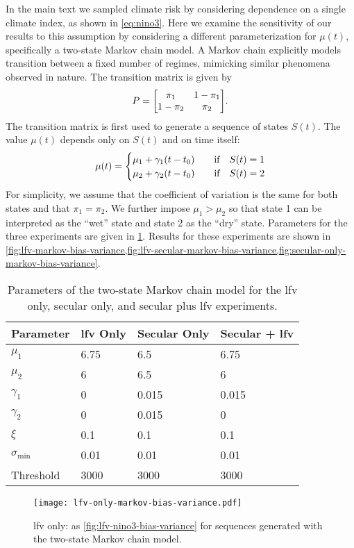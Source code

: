 \documentclass[
]{agujournal2018}
\begin{document}
In the main text we sampled climate risk by considering dependence on a single climate index, as shown in \cref{eq:nino3}.
Here we examine the sensitivity of our results to this assumption by considering a different parameterization for $\mu(t)$, specifically a two-state Markov chain model.
A Markov chain explicitly models transition between a fixed number of regimes, mimicking similar phenomena observed in nature.
The transition matrix is given by
\begin{equation}
  P = \mqty[\pi_1 & 1-\pi_1 \\ 1-\pi_2 & \pi_2].
\end{equation}
The transition matrix is first used to generate a sequence of states $S(t)$.
The value $\mu(t)$ depends only on $S(t)$ and on time itself:
\begin{equation}
  \mu(t) = \begin{cases}
    \mu_{1} + \gamma_1 \qty(t - t_0) & \qqtext{if} S(t) = 1 \\
    \mu_{2} + \gamma_2 \qty(t - t_0) & \qqtext{if} S(t) = 2
  \end{cases}
\end{equation}
For simplicity, we assume that the coefficient of variation is the same for both states and that $\pi_1=\pi_2$.
We further impose $\mu_{1} > \mu_{2}$ so that state 1 can be interpreted as the ``wet'' state and state 2 as the ``dry'' state.
Parameters for the three experiments are given in \cref{tab:markov-stationary}.
Results for these experiments are shown in \cref{fig:lfv-markov-bias-variance,fig:lfv-secular-markov-bias-variance,fig:secular-only-markov-bias-variance}.
\begin{table}[ht]
  \centering
  \begin{tabular}{llll}
    \toprule
    Parameter & \gls{lfv} Only & Secular Only & Secular + \gls{lfv} \\
    \midrule
    $\mu_1$             & 6.75  & 6.5   & 6.75\\
    $\mu_2$             & 6     & 6.5   & 6\\
    $\gamma_1$          & 0     & 0.015 & 0.015\\
    $\gamma_2$          & 0     & 0.015 & 0\\
    $\xi$               & 0.1   & 0.1   & 0.1\\
    $\sigma_\text{min}$ & 0.01  & 0.01  & 0.01\\
    Threshold           & 3000  & 3000  & 3000 \\
    \bottomrule
  \end{tabular}
  \caption{
    Parameters of the two-state Markov chain model for the \gls{lfv} only, secular only, and secular plus \gls{lfv} experiments.
  }\label{tab:markov-stationary}
\end{table}
\begin{figure}
  \centering
  \texttt{[image: lfv-only-markov-bias-variance.pdf]}
  \caption{
    \Gls{lfv} only: as \cref{fig:lfv-nino3-bias-variance} for sequences generated with the two-state Markov chain model.
  }\label{fig:lfv-markov-bias-variance}
\end{figure}
\end{document}
